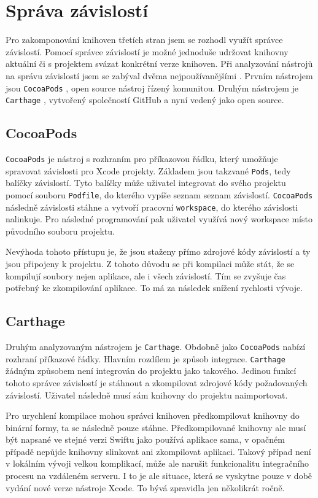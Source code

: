 \section{Správa závislostí}\label{analyza-sprava-zavislosti}

Pro zakomponování knihoven třetích stran jsem se rozhodl využít správce závislostí.
Pomocí správce závislostí je možné jednoduše udržovat knihovny aktuální či s projektem svázat konkrétní verze knihoven.
Při analyzování nástrojů na správu závislostí jsem se zabýval dvěma nejpoužívanějšími \cite{shashikantjagtap-swift-dependency-management}.
Prvním nástrojem jsou \texttt{CocoaPods} \cite{cocoapods-about}, open source nástroj řízený komunitou.
Druhým nástrojem je \texttt{Carthage} \cite{github-carthage}, vytvořený společností GitHub a nyní vedený jako open source.

\subsection{CocoaPods}

\texttt{CocoaPods} je nástroj s rozhraním pro příkazovou řádku, který umožňuje spravovat závislosti pro Xcode projekty.
Základem jsou takzvané \texttt{Pods}, tedy balíčky závislostí.
Tyto balíčky může uživatel integrovat do svého projektu pomocí souboru \texttt{Podfile}, do kterého vypíše seznam seznam závislostí.
\texttt{CocoaPods} následně závislosti stáhne a vytvoří pracovní \texttt{workspace}, do kterého závislosti nalinkuje.
Pro následné programování pak uživatel využívá nový workspace místo původního souboru projektu.

Nevýhoda tohoto přístupu je, že jsou staženy přímo zdrojové kódy závislostí a ty jsou připojeny k projektu.
Z tohoto důvodu se při kompilaci může stát, že se kompilují soubory nejen aplikace, ale i všech závislostí.
Tím se zvyšuje čas potřebný ke zkompilování aplikace.
To má za následek snížení rychlosti vývoje.

\subsection{Carthage}

Druhým analyzovaným nástrojem je \texttt{Carthage}.
Obdobně jako \texttt{CocoaPods} nabízí rozhraní příkazové řádky.
Hlavním rozdílem je způsob integrace.
\texttt{Carthage} žádným způsobem není integrován do projektu jako takového.
Jedinou funkcí tohoto správce závislostí je stáhnout a zkompilovat zdrojové kódy požadovaných závislostí.
Uživatel následně musí sám knihovny do projektu naimportovat.

Pro urychlení kompilace mohou správci knihoven předkompilovat knihovny do binární formy, ta se následně pouze stáhne.
Předkompilované knihovny ale musí být napsané ve stejné verzi Swiftu jako používá aplikace sama, v opačném případě nepůjde knihovny slinkovat ani zkompilovat aplikaci.
Takový případ není v lokálním vývoji velkou komplikací, může ale narušit funkcionalitu integračního procesu na vzdáleném serveru.
I to je ale situace, která se vyskytne pouze v době vydání nové verze nástroje Xcode.
To bývá zpravidla jen několikrát ročně.
